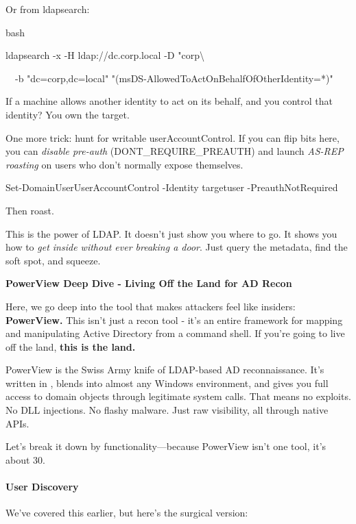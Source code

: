 
Or from ldapsearch:

bash

 

ldapsearch -x -H ldap://dc.corp.local -D "corp\textbackslash{}%

  -b "dc=corp,dc=local" "(msDS-AllowedToActOnBehalfOfOtherIdentity=*)"

If a machine allows another identity to act on its behalf, and you control that identity? You own the target.

One more trick: hunt for writable userAccountControl. If you can flip bits here, you can \textit{disable pre-auth} (DONT\_REQUIRE\_PREAUTH) and launch \textit{AS-REP roasting} on users who don’t normally expose themselves.

 

 

Set-DomainUserUserAccountControl -Identity targetuser -PreauthNotRequired

Then roast.

This is the power of LDAP. It doesn’t just show you where to go. It shows you how to \textit{get inside without ever breaking a door}. Just query the metadata, find the soft spot, and squeeze.

\textbf{PowerView Deep Dive - Living Off the Land for AD Recon}

Here, we go deep into the tool that makes attackers feel like insiders: \textbf{PowerView. }This isn’t just a recon tool - it’s an entire framework for mapping and manipulating Active Directory from a command shell. If you’re going to live off the land, \textbf{this is the land.}

PowerView is the Swiss Army knife of LDAP-based AD reconnaissance. It’s written in  , blends into almost any Windows environment, and gives you full access to domain objects through legitimate system calls. That means no exploits. No DLL injections. No flashy malware. Just raw visibility, all through native APIs.

Let’s break it down by functionality—because PowerView isn’t one tool, it’s about 30.

\paragraph{   User Discovery}

We’ve covered this earlier, but here’s the surgical version:


